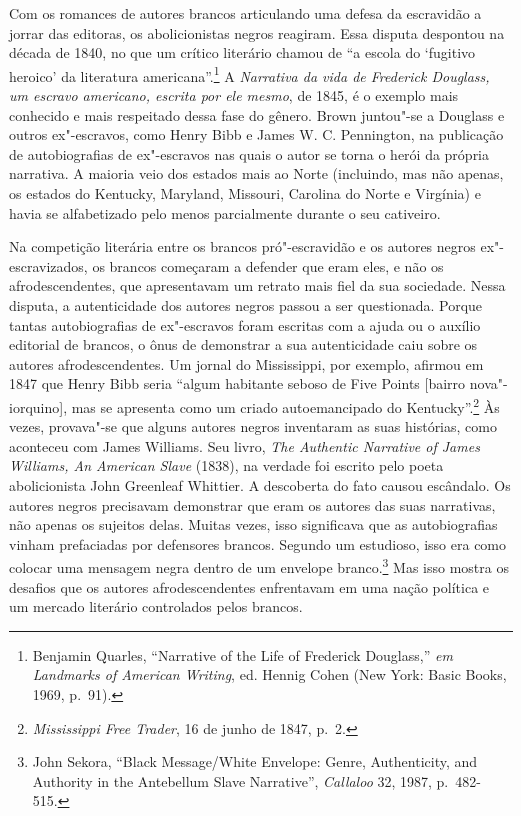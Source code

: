 Com os romances de autores brancos articulando uma defesa da escravidão
a jorrar das editoras, os abolicionistas negros reagiram. Essa disputa
despontou na década de 1840, no que um crítico literário chamou de ``a
escola do `fugitivo heroico' da literatura americana''.\footnote{Benjamin
  Quarles, ``Narrative of the Life of Frederick Douglass,'' \emph{em
  Landmarks of American Writing}, ed. Hennig Cohen (New York: Basic
  Books, 1969, p.~91).} A \emph{Narrativa da vida de Frederick Douglass, um
escravo americano, escrita por ele mesmo}, de 1845, é o exemplo mais
conhecido e mais respeitado dessa fase do gênero. Brown juntou"-se a
Douglass e outros ex"-escravos, como Henry Bibb e James W. C. Pennington,
na publicação de autobiografias de ex"-escravos nas quais o autor se
torna o herói da própria narrativa. A maioria veio dos estados mais ao
Norte (incluindo, mas não apenas, os estados do Kentucky, Maryland,
Missouri, Carolina do Norte e Virgínia) e havia se alfabetizado pelo
menos parcialmente durante o seu cativeiro.

Na competição literária entre os brancos pró"-escravidão e os autores
negros ex"-escravizados, os brancos começaram a defender que eram eles, e
não os afrodescendentes, que apresentavam um retrato mais fiel da sua
sociedade. Nessa disputa, a autenticidade dos autores negros passou a
ser questionada. Porque tantas autobiografias de ex"-escravos foram
escritas com a ajuda ou o auxílio editorial de brancos, o ônus de
demonstrar a sua autenticidade caiu sobre os autores afrodescendentes.
Um jornal do Mississippi, por exemplo, afirmou em 1847 que Henry Bibb
seria ``algum habitante seboso de Five Points {[}bairro
nova"-iorquino{]}, mas se apresenta como um criado autoemancipado do
Kentucky''.\footnote{\emph{Mississippi Free Trader}, 16 de junho de 1847,
  p.~2.} Às vezes, provava"-se que alguns autores negros inventaram as suas
histórias, como aconteceu com James Williams. Seu livro, \emph{The
Authentic Narrative of James Williams, An American Slave} (1838), na
verdade foi escrito pelo poeta abolicionista John Greenleaf Whittier. A
descoberta do fato causou escândalo. Os autores negros precisavam
demonstrar que eram os autores das suas narrativas, não apenas os
sujeitos delas. Muitas vezes, isso significava que as autobiografias
vinham prefaciadas por defensores brancos. Segundo um estudioso, isso
era como colocar uma mensagem negra dentro de um envelope
branco.\footnote{John Sekora, ``Black Message/White Envelope: Genre,
  Authenticity, and Authority in the Antebellum Slave Narrative'',
  \emph{Callaloo} 32, 1987, p.~482-515.} Mas isso mostra os desafios que
os autores afrodescendentes enfrentavam em uma nação política e um
mercado literário controlados pelos brancos.

